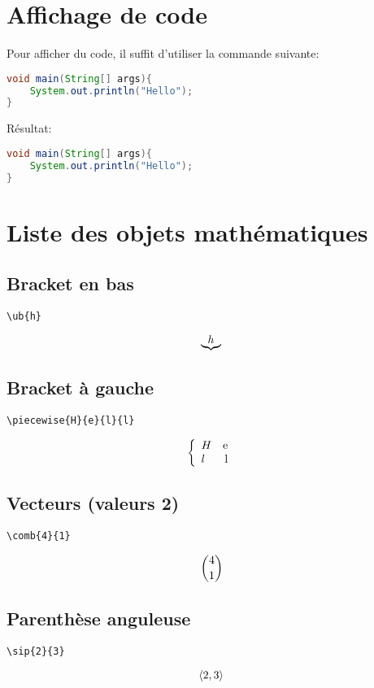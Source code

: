 \documentclass[a4paper, 11pt]{article}
\begin{document}
\section{Affichage de code} %
\label{sec:affichage_de_code}
Pour afficher du code, il suffit d'utiliser la commande suivante:

\begin{TeXlstlisting}
\begin{lstlisting}[language=java]
void main(String[] args){
	System.out.println("Hello");
}
\end{lstlisting}
\end{TeXlstlisting}

Résultat:
\begin{lstlisting}[language=java]
void main(String[] args){
	System.out.println("Hello");
}
\end{lstlisting}

\section{Liste des objets mathématiques} %
\label{sec:liste_des_objets_math_matiques}
\subsection{Bracket en bas}
\begin{verbatim}
\ub{h}
\end{verbatim}
$$\underbrace{h}$$

\subsection{Bracket à gauche}
\begin{verbatim}
\piecewise{H}{e}{l}{l}
\end{verbatim}
$$\left\{ \begin{array}{lr} H & \mbox{e} \\ l & \mbox{l} \end{array} \right.$$

\subsection{Vecteurs (valeurs 2)}
\begin{verbatim}
\comb{4}{1}
\end{verbatim}
$${4 \choose 1}$$

\subsection{Parenthèse anguleuse}
\begin{verbatim}
\sip{2}{3}
\end{verbatim}
$$\langle 2 , 3 \rangle$$
\end{document}
